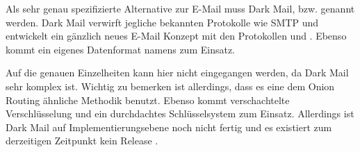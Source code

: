 Als sehr genau spezifizierte Alternative zur E-Mail muss Dark Mail, bzw.   genannt werden. Dark Mail verwirft jegliche bekannten Protokolle wie SMTP und entwickelt ein gänzlich neues E-Mail Konzept mit den Protokollen  und . Ebenso kommt ein eigenes Datenformat namens  zum Einsatz.

Auf die genauen Einzelheiten kann hier nicht eingegangen werden, da Dark Mail sehr komplex ist. Wichtig zu bemerken ist allerdings, dass es eine dem Onion Routing   ähnliche Methodik benutzt. Ebenso kommt verschachtelte Verschlüsselung und ein durchdachtes Schlüsselsystem zum Einsatz. Allerdings ist Dark Mail auf Implementierungsebene noch nicht fertig und es existiert zum derzeitigen Zeitpunkt kein Release .
